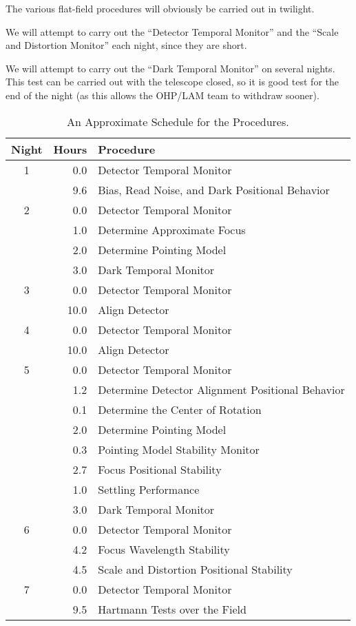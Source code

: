 \documentclass{article}
\begin{document}
The various flat-field procedures will obviously be carried out in twilight.

We will attempt to carry out the “Detector Temporal Monitor” and the “Scale and Distortion Monitor” each night, since they are short. 

We will attempt to carry out the “Dark Temporal Monitor” on several nights. This test can be carried out with the telescope closed, so it is good test for the end of the night (as this allows the OHP/LAM team to withdraw sooner).

\begin{table}
\caption{An Approximate Schedule for the Procedures.}
\label{table:schedule}
\centering
\footnotesize
\begin{tabular}{crp{8cm}}
\hline
Night&Hours&Procedure\\
\hline
1&0.0&Detector Temporal Monitor\\
 &9.6&Bias, Read Noise, and Dark Positional Behavior\\
\hline
2&0.0&Detector Temporal Monitor\\
 &1.0&Determine Approximate Focus\\
 &2.0&Determine Pointing Model\\
 &3.0&Dark Temporal Monitor\\
\hline
3&0.0&Detector Temporal Monitor\\
 &10.0&Align Detector\\
\hline
4&0.0&Detector Temporal Monitor\\
 &10.0&Align Detector\\
\hline
5&0.0&Detector Temporal Monitor\\
 &1.2&Determine Detector Alignment Positional Behavior\\
 &0.1&Determine the Center of Rotation\\
 &2.0&Determine Pointing Model\\
 &0.3&Pointing Model Stability Monitor\\
 &2.7&Focus Positional Stability\\
 &1.0&Settling Performance\\
 &3.0&Dark Temporal Monitor\\
\hline
6&0.0&Detector Temporal Monitor\\
 &4.2&Focus Wavelength Stability\\
 &4.5&Scale and Distortion Positional Stability\\
\hline
7&0.0&Detector Temporal Monitor\\
 &9.5&Hartmann Tests over the Field\\

\end{tabular}
\end{table}
\end{document}
